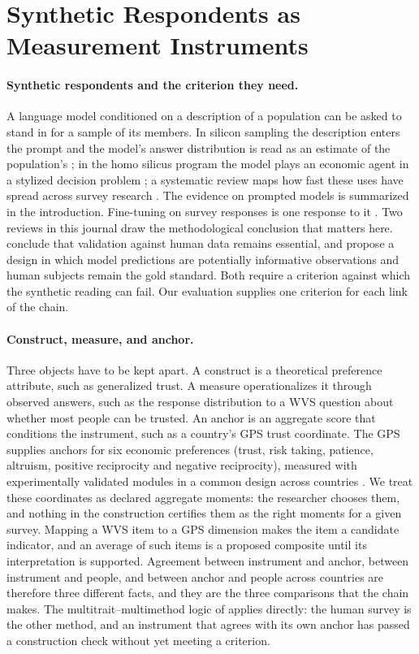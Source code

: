 \section{Synthetic Respondents as Measurement Instruments}\label{sec:background}

\paragraph{Synthetic respondents and the criterion they need.} A language model conditioned on a description of a population can be asked to stand in for a sample of its members. In silicon sampling the description enters the prompt and the model's answer distribution is read as an estimate of the population's \citep{argyle2023}; in the homo silicus program the model plays an economic agent in a stylized decision problem \citep{horton2023}; a systematic review maps how fast these uses have spread across survey research \citep{buskirk2026}. The evidence on prompted models is summarized in the introduction. Fine-tuning on survey responses is one response to it \citep{suh2025,cao2025,krsteski2026}. Two reviews in this journal draw the methodological conclusion that matters here. \citet{kozlowski2025} conclude that validation against human data remains essential, and \citet{broska2025} propose a design in which model predictions are potentially informative observations and human subjects remain the gold standard. Both require a criterion against which the synthetic reading can fail. Our evaluation supplies one criterion for each link of the chain.

\paragraph{Construct, measure, and anchor.} Three objects have to be kept apart. A construct is a theoretical preference attribute, such as generalized trust. A measure operationalizes it through observed answers, such as the response distribution to a WVS question about whether most people can be trusted. An anchor is an aggregate score that conditions the instrument, such as a country's GPS trust coordinate. The GPS supplies anchors for six economic preferences (trust, risk taking, patience, altruism, positive reciprocity and negative reciprocity), measured with experimentally validated modules in a common design across countries \citep{falk2018}. We treat these coordinates as declared aggregate moments: the researcher chooses them, and nothing in the construction certifies them as the right moments for a given survey. Mapping a WVS item to a GPS dimension makes the item a candidate indicator, and an average of such items is a proposed composite until its interpretation is supported. Agreement between instrument and anchor, between instrument and people, and between anchor and people across countries are therefore three different facts, and they are the three comparisons that the chain makes. The multitrait--multimethod logic of \citet{campbellfiske1959} applies directly: the human survey is the other method, and an instrument that agrees with its own anchor has passed a construction check without yet meeting a criterion.

